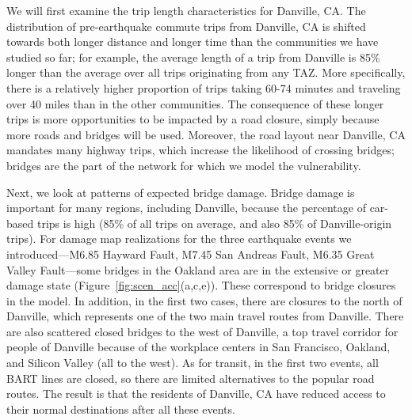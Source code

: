 
We will first examine the trip length characteristics for Danville, CA. %
The distribution of pre-earthquake commute trips from Danville, CA is shifted towards both longer distance and longer time than the communities we have studied so far; for example, the average length of a trip from Danville is 85\% longer than the average over all trips originating from any TAZ. More specifically, there is a relatively higher proportion of trips taking 60-74 minutes and traveling over 40 miles than in the other communities. The consequence of these longer trips is more opportunities to be impacted by a road closure, simply because more roads and bridges will be used. Moreover, the road layout near Danville, CA mandates many highway trips, which increase the likelihood of crossing bridges; bridges are the part of the network for which we model the vulnerability. 


Next, we look at patterns of expected bridge damage. Bridge damage is important for many regions, including Danville, because the percentage of car-based trips is high (85\% of all trips on average, and also 85\% of Danville-origin trips). For damage map realizations for the three  earthquake events we introduced---M6.85 Hayward Fault, M7.45 San Andreas Fault, M6.35 Great Valley Fault---some bridges in the Oakland area are in the extensive or greater damage state (Figure~\ref{fig:scen_acc}{(a,c,e)}). These correspond to bridge closures in the model. In addition, in the first two cases, there are closures to the north of Danville, which represents one of the two main travel routes from Danville. There are also scattered closed bridges to the west of Danville, a top travel corridor for people of Danville because of the workplace centers in San Francisco, Oakland, and Silicon Valley (all to the west). As for transit, in the first two events, all BART lines are closed, so there are limited alternatives to the popular road routes. The result is that the residents of Danville, CA have reduced access to their normal destinations after all these events. 

